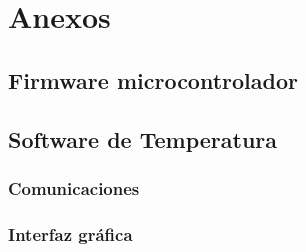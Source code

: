 
%




\chapter{Anexos}
	\section{Firmware microcontrolador}
		
	
	\section{Software de Temperatura}
		\subsection{Comunicaciones}
			
			
		\subsection{Interfaz gr\'afica}
			